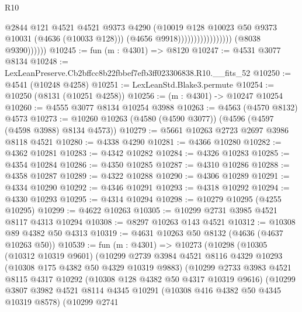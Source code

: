 \begin{lexlean}{R10}
\begin{coremodule}
                                              @2844
                                              @121
                                              @4521
                                              @4521
                                              @9373
                                              @4290
                                              (@10019
                                                @128
                                                @10023
                                                @50
                                                @9373
                                                @10031
                                                (@4636 (@10033 @128)))
                                              (@4656 @9918)))))))))))))))))
              (@8038 @9390))))))
@10245 := fun (m : @4301) => @8120
@10247 := @4531 @3077 @8134
@10248 := LexLeanPreserve.Cb2bffcc8b22fbbef7efb3ff023306838.R10.__fits_52
@10250 := @4541 (@10248 @4258)
@10251 := LexLeanStd.Blake3.permute
@10254 := @10250 (@8131 (@10251 @4258))
@10256 := (m : @4301) -> @10247 @10254
@10260 := @4555 @3077 @8134 @10254 @3988
@10263 := @4563 (@4570 @8132) @4573
@10273 := @10260 @10263 (@4580 (@4590 @3077)) (@4596 (@4597 (@4598 @3988) @8134 @4573))
@10279 := @5661 @10263 @2723 @2697 @3986 @8118 @4521
@10280 := @4338 @4290
@10281 := @4366 @10280
@10282 := @4362 @10281
@10283 := @4342 @10282
@10284 := @4326 @10283
@10285 := @4354 @10284
@10286 := @4350 @10285
@10287 := @4310 @10286
@10288 := @4358 @10287
@10289 := @4322 @10288
@10290 := @4306 @10289
@10291 := @4334 @10290
@10292 := @4346 @10291
@10293 := @4318 @10292
@10294 := @4330 @10293
@10295 := @4314 @10294
@10298 := @10279 @10295 (@4255 @10295)
@10299 := @4622 @10263
@10305 := @10299 @2731 @3985 @4521 @8117 @4313 @10294
@10308 := @8297 @10263 @143 @4521
@10312 := @10308 @89 @4382 @50 @4313
@10319 := @4631 @10263 @50 @8132 (@4636 (@4637 @10263 @50))
@10539 := fun (m : @4301) =>
  @10273
    (@10298
      (@10305
        (@10312 @10319 @9601)
        (@10299
          @2739
          @3984
          @4521
          @8116
          @4329
          @10293
          (@10308 @175 @4382 @50 @4329 @10319 @9883)
          (@10299
            @2733
            @3983
            @4521
            @8115
            @4317
            @10292
            (@10308 @128 @4382 @50 @4317 @10319 @9616)
            (@10299
              @3807
              @3982
              @4521
              @8114
              @4345
              @10291
              (@10308 @416 @4382 @50 @4345 @10319 @8578)
              (@10299
                @2741

\end{coremodule}
\end{lexlean}
